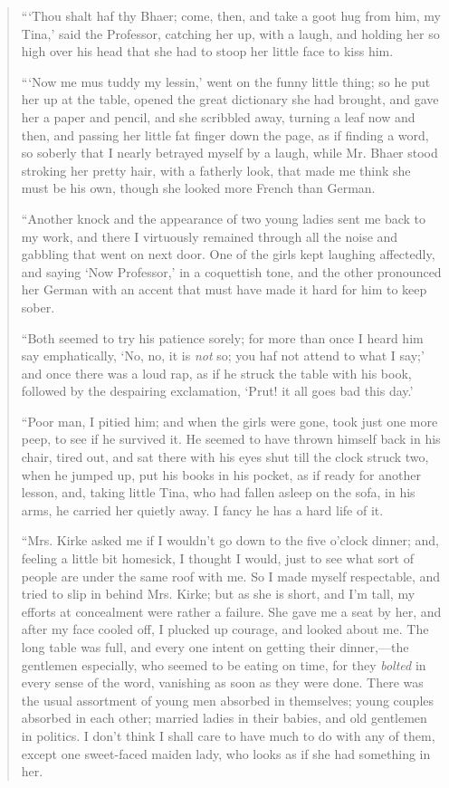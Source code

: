 \begin{quote}
```Thou shalt haf thy Bhaer; come, then, and take a goot
hug from him, my Tina,' said the Professor, catching
her up, with a laugh, and holding her so high over his head that she had
to stoop her little face to kiss him.

```Now me mus tuddy my lessin,' went on
the funny little thing; so he put her up at the table, opened the great
dictionary she had brought, and gave her a paper and pencil, and she
scribbled away, turning a leaf now and then, and passing her little fat
finger down the page, as if finding a word, so soberly that I nearly
betrayed myself by a laugh, while Mr. Bhaer stood stroking her pretty
hair, with a fatherly look, that made me think she must be his own,
though she looked more French than German.

``Another knock and the appearance of two young ladies sent me back to my
work, and there I virtuously remained through all the noise and gabbling
that went on next door. One of the girls kept laughing affectedly, and
saying `Now Professor,' in a coquettish
tone, and the other pronounced her German with an accent that must have
made it hard for him to keep sober.

``Both seemed to try his patience sorely; for more than once I heard him
say emphatically, `No, no, it is \emph{not} so; you haf
not attend to what I say;' and once there was a loud
rap, as if he struck the table with his book, followed by the despairing
exclamation, `Prut! it all goes bad this
day.'

``Poor man, I pitied him; and when the girls were gone, took just one
more peep, to see if he survived it. He seemed to have thrown himself
back in his chair, tired out, and sat there with his eyes shut till the
clock struck two, when he jumped up, put his books in his pocket, as if
ready for another lesson, and, taking little Tina, who had fallen asleep
on the sofa, in his arms, he carried her quietly away. I fancy he has a
hard life of it.

``Mrs. Kirke asked me if I wouldn't go down to the five
o'clock dinner; and, feeling a little bit homesick, I
thought I would, just to see what sort of people are under the same roof
with me. So I made myself respectable, and tried to slip in behind Mrs.
Kirke; but as she is short, and I'm tall, my efforts at
concealment were rather a failure. She gave me a seat by her, and after
my face cooled off, I plucked up courage, and looked about me. The long
table was full, and every one intent on getting their dinner,---the
gentlemen especially, who seemed to be eating on time, for they
\emph{bolted} in every sense of the word, vanishing as soon as they were
done. There was the usual assortment of young men absorbed in
themselves; young couples absorbed in each other; married ladies in
their babies, and old gentlemen in politics. I don't
think I shall care to have much to do with any of them, except one
sweet-faced maiden lady, who looks as if she had something in her.


\end{quote}

